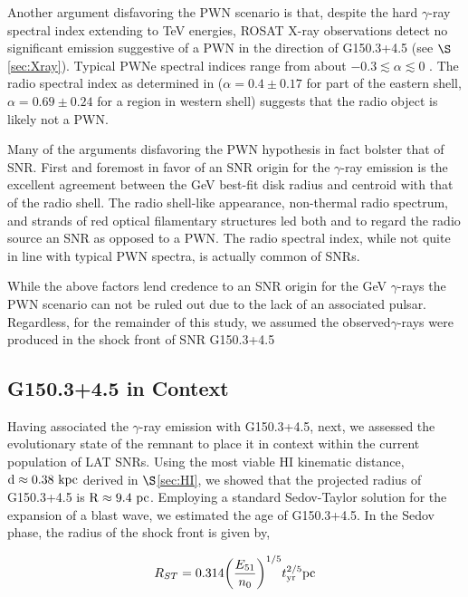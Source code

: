 \documentclass[iop]{emulateapj}
\newcommand{\gam}{$\gamma$-ray}
\newcommand{\Gone}{G150.3+4.5}
\begin{document}
Another argument disfavoring the PWN scenario is that, despite the hard \gam{} spectral index extending to TeV energies, ROSAT X-ray observations detect no significant emission suggestive of a PWN in the direction of \Gone{} (see $\S$\ref{sec:Xray}). Typical PWNe spectral indices range from about $-0.3 \lesssim \alpha  \lesssim  0$ \citep{Gaensler06}. The radio spectral index  as determined in \cite{Gao14}  ($\alpha = 0.4 \pm 0.17$ for part of the eastern shell, $\alpha = 0.69 \pm 0.24$ for a region in western shell) suggests that the radio object is likely not a PWN.
	
Many of the arguments disfavoring the PWN hypothesis in fact bolster that of SNR. First and foremost in favor of an SNR origin for the \gam{} emission is the excellent agreement between the GeV best-fit disk radius and centroid with that of the radio shell.  The radio shell-like appearance, non-thermal radio spectrum, and strands of red optical filamentary structures led both \cite{Gao14} and \cite{Gerbrandt14} to regard the radio source an SNR as opposed to a PWN.  The radio spectral index, while not quite in line with typical PWN spectra, is actually  common of SNRs.

While the above factors lend credence to an SNR origin for the GeV \gam{}s the PWN  scenario can not be ruled out due to the lack of an associated pulsar. Regardless, for the remainder of this study, we assumed the observed\gam{}s were produced in the shock front of SNR \Gone{}

\subsection{\Gone{} in Context }\label{sec:SNRevo}

Having associated the \gam{} emission with \Gone{}, next, we assessed the evolutionary state of the remnant to place it in context within the current population of LAT SNRs. Using the most viable HI kinematic distance, ${\rm d  \approx 0.38~kpc}$ derived in $\S$\ref{sec:HI}, we showed that the projected radius of \Gone{} is ${\rm R \approx 9.4~pc}$. Employing a standard Sedov-Taylor solution for the expansion of a blast wave, we estimated the age of \Gone{}. In the Sedov phase, the radius of the shock front is given by,


\begin{equation} \label{eq:ST}
R_{ST} = 0.314 \bigg{(}\frac{E_{51}}{n_0} \bigg{)}^{1/5} t_{{\rm yr}}^{2/5} {\rm  pc}
\end{equation}
\end{document}
